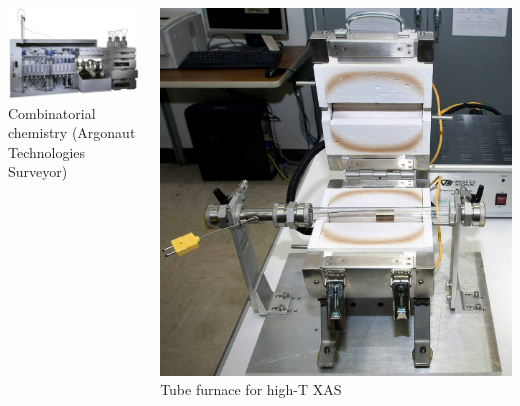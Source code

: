 \documentclass[10pt, xcolor=x11names, compress]{beamer}
\begin{document}
\begin{frame}
\begin{columns}[T]
\begin{column}{0.25\linewidth}
\begin{center}
        \smallskip

        \includegraphics[width=0.85\linewidth]{exp/Surveyor-large.jpg}\\
        Combinatorial chemistry {\tiny(Argonaut Technologies Surveyor)}
      \end{center}
    \end{column}
    \begin{column}{0.25\linewidth}
      \begin{center}
        \includegraphics[width=0.77\linewidth]{exp/furnace.jpg}\\
        Tube furnace for high-T XAS
        \smallskip


\end{center}
\end{column}
\end{columns}
\end{frame}
\end{document}
